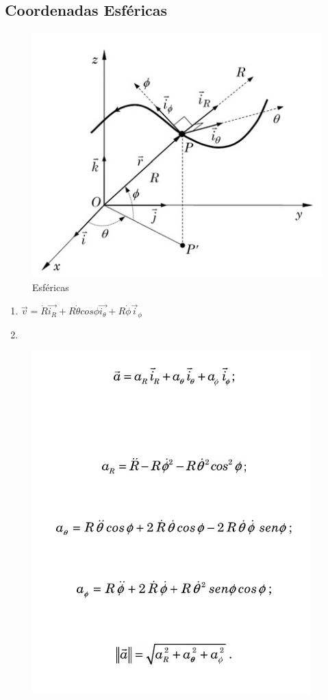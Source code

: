 \documentclass[a4paper, 12pt]{article}
\begin{document}
	\subsection{Coordenadas Esféricas}
		\begin{figure}[h]
			\center
			\includegraphics[scale=0.5]{imagens/e.png} 
			\caption{Esféricas}
		\end{figure}
	\begin{enumerate}
		\item $\vec{v} = \dot{R}\vec{i_R} + R\dot{\theta}cos\phi\vec{i_{\theta}} + R\dot{\phi}\vec{i}_{\phi}$
		\item 
	\end{enumerate}
		\begin{figure}[h]
			\center
			\includegraphics[scale=0.5]{imagens/ee.png} 
		\end{figure}	
\end{document}
